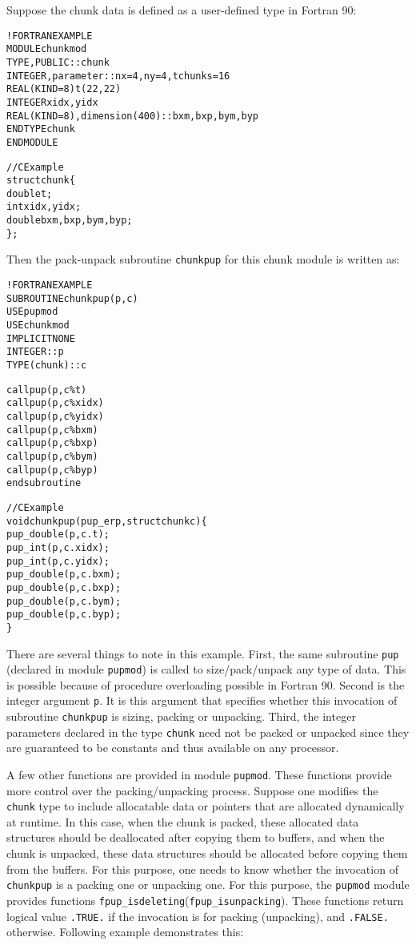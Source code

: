 \documentclass[10pt]{article}
\begin{document}
Suppose the chunk data is defined as a user-defined type in Fortran 90:

\begin{alltt}
!FORTRAN EXAMPLE
MODULE chunkmod
  TYPE, PUBLIC :: chunk
      INTEGER , parameter :: nx=4, ny=4, tchunks=16
      REAL(KIND=8) t(22,22)
      INTEGER xidx, yidx
      REAL(KIND=8), dimension(400):: bxm, bxp, bym, byp
  END TYPE chunk
END MODULE

//C Example
struct chunk\{
  double t;
  int xidx, yidx;
  double bxm,bxp,bym,byp;
\};
\end{alltt}

Then the pack-unpack subroutine \texttt{chunkpup} for this chunk module is
written as:

\begin{alltt}
!FORTRAN EXAMPLE
SUBROUTINE chunkpup(p, c)
  USE pupmod
  USE chunkmod
  IMPLICIT NONE
  INTEGER :: p
  TYPE(chunk) :: c

  call pup(p, c\%t)
  call pup(p, c\%xidx)
  call pup(p, c\%yidx)
  call pup(p, c\%bxm)
  call pup(p, c\%bxp)
  call pup(p, c\%bym)
  call pup(p, c\%byp)
end subroutine

//C Example
void chunkpup(pup_er p, struct chunk c)\{
  pup_double(p,c.t);
  pup_int(p,c.xidx);
  pup_int(p,c.yidx);
  pup_double(p,c.bxm);
  pup_double(p,c.bxp);
  pup_double(p,c.bym);
  pup_double(p,c.byp);
\}
\end{alltt}

There are several things to note in this example. First, the same subroutine
\texttt{pup} (declared in module \texttt{pupmod}) is called to size/pack/unpack
any type of data. This is possible because of procedure overloading possible in
Fortran 90. Second is the integer argument \texttt{p}. It is this argument that
specifies whether this invocation of subroutine \texttt{chunkpup} is sizing,
packing or unpacking. Third, the integer parameters declared in the type
\texttt{chunk} need not be packed or unpacked since they are guaranteed to be
constants and thus available on any processor.

A few other functions are provided in module \texttt{pupmod}. These functions
provide more control over the packing/unpacking process. Suppose one modifies
the \texttt{chunk} type to include allocatable data or pointers that are
allocated dynamically at runtime. In this case, when the chunk is packed, these
allocated data structures should be deallocated after copying them to buffers,
and when the chunk is unpacked, these data structures should be allocated
before copying them from the buffers.  For this purpose, one needs to know
whether the invocation of \texttt{chunkpup} is a packing one or unpacking one.
For this purpose, the \texttt{pupmod} module provides functions
\verb+fpup_isdeleting+(\verb+fpup_isunpacking+). These functions return logical value
\verb+.TRUE.+ if the invocation is for packing (unpacking), and \verb+.FALSE.+
otherwise. Following example demonstrates this:
\end{document}
